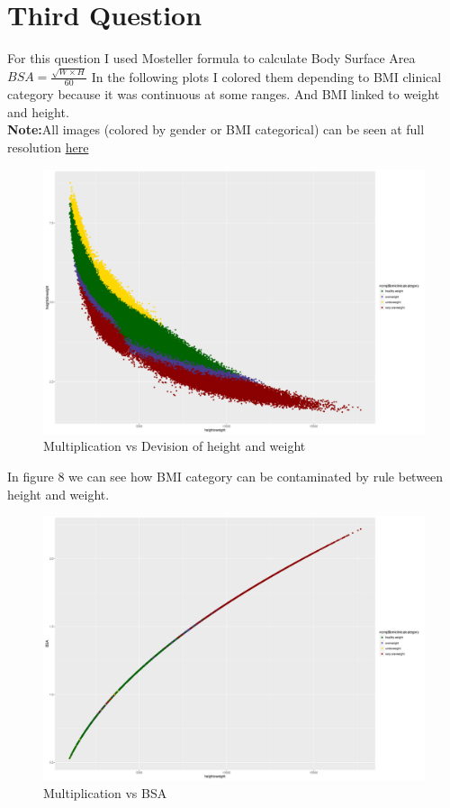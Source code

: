 \documentclass{article}
\begin{document}
	\section*{Third Question}
	For this question I used Mosteller formula to calculate Body Surface Area \(BSA =\frac{\sqrt{W\times H}}{60}\)
	In the following plots I colored them depending to BMI clinical category because it was continuous at some ranges. And BMI linked to weight and height.\\ \textbf{Note:}All images (colored by gender or BMI categorical) can be seen at full resolution \href{https://github.com/aqeel13932/DM/tree/master/HW04}{here}
	\begin{figure}[H]
		\begin{center}
			\includegraphics[scale=0.4]{xdiv.png}
		\end{center}
		\caption{Multiplication vs Devision of height and weight }
	\end{figure}
	In figure 8 we can see how BMI category can be contaminated by rule between height and weight.
		\begin{figure}[H]
			\begin{center}
				\includegraphics[scale=0.4]{xbsa.png}
			\end{center}
			\caption{Multiplication vs BSA}
		\end{figure}
\end{document}
